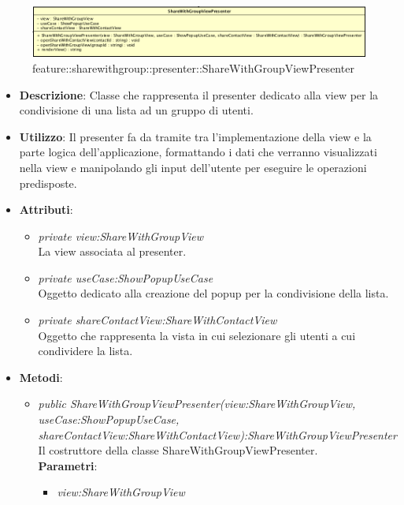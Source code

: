 \label{feature::sharewithgroup::presenter::ShareWithGroupViewPresenter}
\begin{figure}[H]
	\centering
	\includegraphics[scale=0.5]{Sezioni/SottosezioniST/img/app/ShareWithGroupViewPresenter.png}
	\caption{feature::sharewithgroup::presenter::ShareWithGroupViewPresenter}
\end{figure}

\begin{itemize}
\item \textbf{Descrizione}: Classe che rappresenta il presenter dedicato alla view per la condivisione di una lista ad un gruppo di utenti.
\item \textbf{Utilizzo}: Il presenter fa da tramite tra l'implementazione della view e la parte logica dell'applicazione, formattando i dati che verranno visualizzati nella view e manipolando gli input dell'utente per eseguire le operazioni predisposte.
\item \textbf{Attributi}: 
	\begin{itemize}
	\item \textit{private view:ShareWithGroupView}\\
			La view associata al presenter.
	\item \textit{private useCase:ShowPopupUseCase}\\
		Oggetto dedicato alla creazione del popup per la condivisione della lista.
	\item \textit{private shareContactView:ShareWithContactView}\\
		Oggetto che rappresenta la vista in cui selezionare gli utenti a cui condividere la lista.
	\end{itemize} 
\item \textbf{Metodi}:
	\begin{itemize}
	\item \textit{public ShareWithGroupViewPresenter(view:ShareWithGroupView, useCase:ShowPopupUseCase, \\ shareContactView:ShareWithContactView):ShareWithGroupViewPresenter}\\
	Il costruttore della classe ShareWithGroupViewPresenter.
			\\ \textbf{Parametri}: \begin{itemize}
			\item \textit{view:ShareWithGroupView}\\

\end{itemize}
\end{itemize}
\end{itemize}
